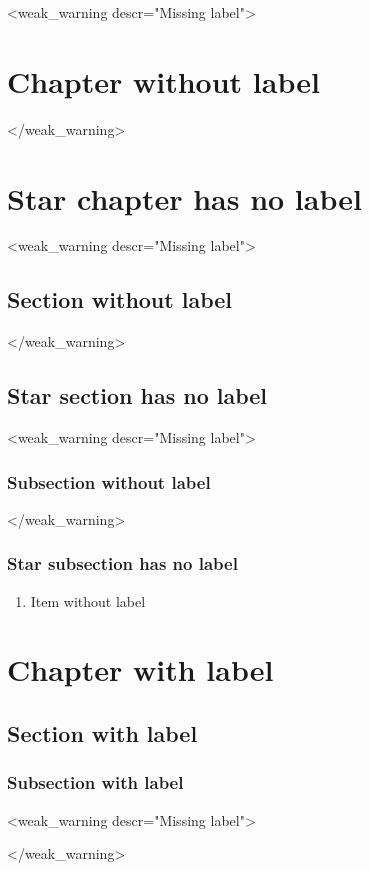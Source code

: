 \documentclass{article}
\begin{document}
    <weak_warning descr="Missing label">\chapter{Chapter without label}</weak_warning>
    \chapter*{Star chapter has no label}
    <weak_warning descr="Missing label">\section{Section without label}</weak_warning>
    \section*{Star section has no label}
    <weak_warning descr="Missing label">\subsection{Subsection without label}</weak_warning>
    \subsection*{Star subsection has no label}
    \begin{enumerate}
        \item Item without label
    \end{enumerate}
    \chapter{Chapter with label}
    \label{ch:chapter-label}
    \section{Section with label}
    \label{sec:section-label}
    \subsection{Subsection with label}
    \label{subsec:subsection-label}

    <weak_warning descr="Missing label">\begin{figure}
    \end{figure}</weak_warning>

    \begin{figure}
        \label{fig:figure-label}
    \end{figure}
\end{document}
